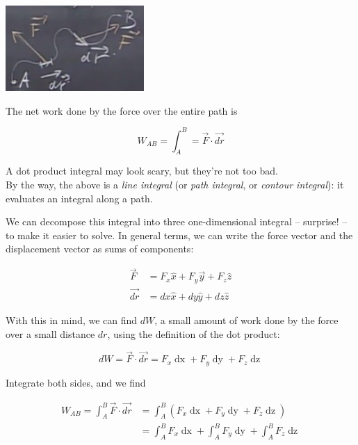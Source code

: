 \documentclass[12pt,a4paper]{report}
\begin{document}
\begin{center}
\includegraphics[scale=0.8]{Graphics/lec11_work_3d}
\end{center}

The net work done by the force over the entire path is

\begin{equation}
W_{AB} = \int_A^B = \vec{F} \cdot \vec{dr}
\end{equation}

A dot product integral may look scary, but they're not too bad.\\
By the way, the above is a \emph{line integral} (or \emph{path integral}, or \emph{contour integral}): it evaluates an integral along a path.

We can decompose this integral into three one-dimensional integral -- surprise! -- to make it easier to solve. In general terms, we can write the force vector and the displacement vector as sums of components:

\begin{align}
\vec{F}  &= F_x \hat{x} + F_y \vec{y} + F_z \hat{z}\\
\vec{dr} &= dx \hat{x} + dy \hat{y} + dz \hat{z}
\end{align}

With this in mind, we can find $dW$, a small amount of work done by the force over a small distance $dr$, using the definition of the dot product:

\begin{equation}
dW = \vec{F} \cdot \vec{dr} = F_x \mathop{dx} + F_y \mathop{dy} + F_z \mathop{dz}
\end{equation}

Integrate both sides, and we find

\begin{align}
W_{AB} = \int_A^B \vec{F} \cdot \vec{dr} &= \int_A^B \left(F_x \mathop{dx} + F_y \mathop{dy} + F_z \mathop{dz}\right)\\
                                    &= \int_A^B F_x \mathop{dx} + \int_A^B F_y \mathop{dy} + \int_A^B F_z \mathop{dz}
\end{align}
\end{document}
